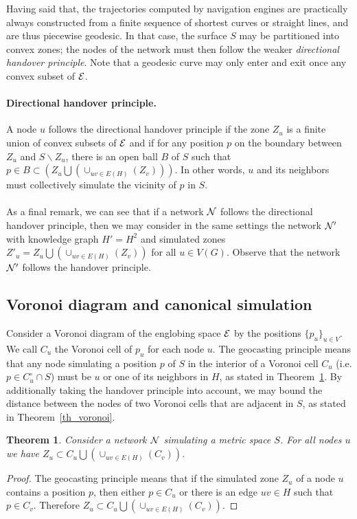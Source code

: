 \documentclass{article}
\newcommand{\englobing}{{\cal E}}
\newtheorem{theorem}{Theorem}
\begin{document}
Having said that, the trajectories computed by navigation engines are practically always constructed from a finite sequence of shortest curves or straight lines, and are thus piecewise geodesic. In that case, the surface $S$ may be partitioned into convex zones; the nodes of the network must then follow the weaker {\em directional handover principle}. Note that a geodesic curve may only enter and exit once any convex subset of $\englobing$.

\label{sub_directional}
\paragraph{Directional handover principle.} A node $u$ follows the directional handover principle if the zone $Z_u$ is a finite union of convex subsets of $\englobing$ and
if for any position $p$ on the boundary between $Z_u$ and $S\backslash Z_u$, there is an open ball $B$ of $S$ such that $p\in B\subset(Z_u\bigcup (\cup_{uv\in E(H)} (Z_v)))$.
In other words, $u$ and its neighbors must collectively simulate the vicinity of $p$ in $S$.
\paragraph{}

As a final remark, we can see that if a network $\cal N$ follows the directional handover principle, then we may consider in the same settings the network $\cal N'$ with knowledge graph $H'=H^2$ and simulated zones $Z'_u=Z_u\bigcup (\cup_{uv\in E(H)} (Z_v))$ for all $u\in V(G)$. Observe that the network $\cal N'$ follows the handover principle.

\subsection{Voronoi diagram and canonical simulation}
\label{sub_voronoi}
Consider a Voronoi diagram of the englobing space $\englobing$ by the positions $\{p_u\}_{u\in V}$. We call $C_u$ the Voronoi cell of $p_u$ for each node $u$. The geocasting principle means that any node simulating a position $p$ of $S$ in the interior of a Voronoi cell $C_u$ (i.e. $p\in C_u^\circ\cap S$) must be $u$ or one of its neighbors in $H$, as stated in Theorem~\ref{th_voronoi1}. By additionally taking the handover principle into account, we may bound the distance between the nodes of two Voronoi cells that are adjacent in $S$, as stated in Theorem~\ref{th_voronoi}.

\begin{theorem}
Consider a network $\cal N$ simulating a metric space $S$. For all nodes $u$ we have $Z_u \subset C_u\bigcup (\cup_{uv\in E(H)} (C_v))$.
\label{th_voronoi1}
\end{theorem}
\begin{proof}
The geocasting principle means that if the simulated zone $Z_u$ of a node $u$ contains a position $p$, then either $p\in C_u$ or there is an edge $uv\in H$ such that $p\in C_v$. Therefore $Z_u\subset C_u\bigcup (\cup_{uv\in E(H)} (C_v))$. 
\end{proof}
\end{document}
